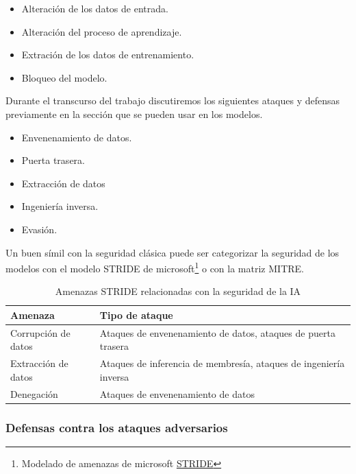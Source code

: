 \begin{itemize}
  \item Alteración de los datos de entrada.
  \item Alteración del proceso de aprendizaje.
  \item Extración de los datos de entrenamiento.
  \item Bloqueo del modelo.
\end{itemize}

Durante el transcurso del trabajo discutiremos los siguientes ataques y defensas previamente en la sección  que se pueden usar en los modelos.

\begin{itemize}
  \item Envenenamiento de datos.
  \item Puerta trasera.
  \item Extracción de datos
  \item Ingeniería inversa.
  \item Evasión.
\end{itemize}

Un buen símil con la seguridad clásica puede ser categorizar la seguridad de los modelos con el modelo \gls{STRIDE} de microsoft\footnote{Modelado de amenazas de microsoft \href{https://learn.microsoft.com/es-es/azure/security/develop/threat-modeling-tool-threats}{STRIDE}} o con la matriz \gls{MITRE}.

\begin{table}[H]
  \centering
  \small
  \def\arraystretch{1.5}
  \begin{tabular}{lp{10cm}}
    \toprule
    \textbf{Amenaza}    & \textbf{Tipo de ataque}                                           \\
    \midrule
    Corrupción de datos & Ataques de envenenamiento de datos, ataques de puerta trasera     \\
    Extracción de datos & Ataques de inferencia de membresía, ataques de ingeniería inversa \\
    Denegación          & Ataques de envenenamiento de datos                                \\
    \bottomrule
  \end{tabular}
  \caption{Amenazas STRIDE relacionadas con la seguridad de la IA}
  \label{tab.amenazas}
\end{table}

\subsubsection{Defensas contra los ataques adversarios}
